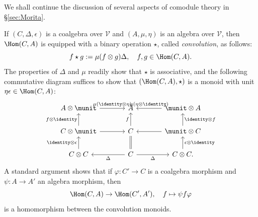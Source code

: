 We shall continue the discussion of several aspects of comodule theory in
\S\ref{sec:Morita}.

\begin{remark}\label{rem:coalgebra-convolution}
	If $(C,\Delta,\epsilon)$ is a coalgebra over $\mathcal{V}$ and
	$(A,\mu,\eta)$ is an algebra over $\mathcal{V}$, then $\Hom(C,A)$ is
	equipped with a binary operation $\star$, called \emph{convolution}, as
	follows:
	\[ f \star g := \mu (f \otimes g) \Delta, \quad f, g \in \Hom(C, A). \]
	The properties of $\Delta$ and $\mu$ readily show that $\star$ is
	associative, and the following commutative diagram suffices to show that
	$(\Hom(C,A),\star)$ is a monoid with unit
	$\eta\epsilon\in\Hom(C,A)$:
	\[\begin{tikzcd}[column sep=large]
		A \otimes \munit \arrow[r, "{\mu(\identity \otimes \eta)}"] & A & \munit \otimes A \arrow[l, "{\mu(\eta \otimes \identity)}"'] \\
		C \otimes \munit \arrow[r] \arrow[u, "{f \otimes \identity}"] & C \arrow[u, "f"] & \munit \otimes C \arrow[l] \arrow[u, "{\identity \otimes f}"'] \\
		C \otimes C \arrow[u, "{\identity \otimes \epsilon}"] & C \arrow[l, "\Delta"] \arrow[r, "\Delta"'] \arrow[equal, u] & C \otimes C . \arrow[u, "{\epsilon \otimes \identity}"']
	\end{tikzcd}\]
	A standard argument shows that if $\varphi:C'\to C$ is a coalgebra
	morphism and $\psi:A\to A'$ an algebra morphism, then
	\begin{equation}\label{eqn:convolution-functorial}
		\Hom(C, A) \to \Hom(C', A'), \quad f \mapsto \psi f \varphi
	\end{equation}
	is a homomorphism between the convolution monoids.
\end{remark}

